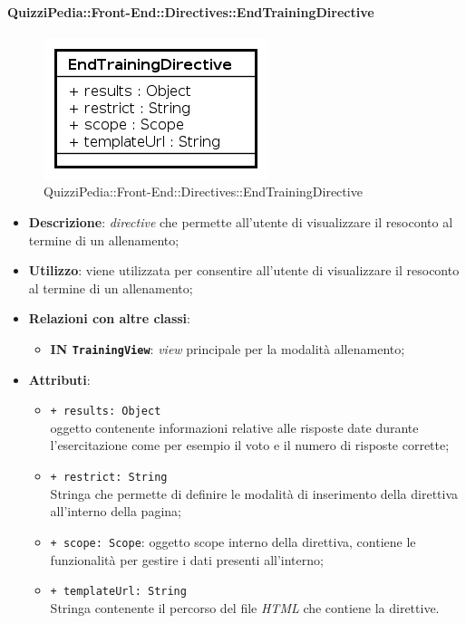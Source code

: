 	\paragraph{QuizziPedia::Front-End::Directives::EndTrainingDirective}
		
		\label{QuizziPedia::Front-End::Directives::EndTrainingDirective}
		
		\begin{figure}[ht]
			\centering
			\includegraphics[scale=0.80,keepaspectratio]{UML/Classi/Front-End/QuizziPedia_Front-end_Directives_EndTrainingDirective.png}
			\caption{QuizziPedia::Front-End::Directives::EndTrainingDirective}
		\end{figure} \FloatBarrier
		
		\begin{itemize}
			\item \textbf{Descrizione}: \textit{directive} che permette all'utente di visualizzare il resoconto al termine di un allenamento;
			\item \textbf{Utilizzo}: viene utilizzata per consentire all'utente di visualizzare il resoconto al termine di un allenamento;
			\item \textbf{Relazioni con altre classi}: 
			\begin{itemize}
				\item \textbf{IN \texttt{TrainingView}}: \textit{view} principale per la modalità allenamento;
			\end{itemize}
			\item \textbf{Attributi}:
			\begin{itemize}
				\item \texttt{+ results: Object} \\ oggetto contenente informazioni relative alle risposte date durante l'esercitazione come per esempio il voto e il numero di risposte corrette; 
		\item \texttt{+ restrict: String} \\ Stringa che permette di definire le modalità di inserimento della direttiva all'interno della pagina;
		\item \texttt{+ scope: Scope}: oggetto scope interno della direttiva, contiene le funzionalità per gestire i dati presenti all'interno;
		\item \texttt{+ templateUrl: String} \\ Stringa contenente il percorso del file \textit{HTML} che contiene la direttive.
			\end{itemize}
		\end{itemize}